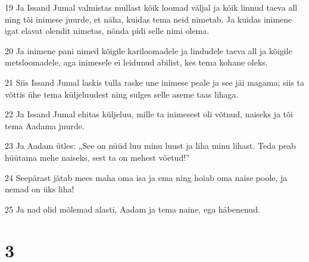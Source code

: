 \par 19 Ja Issand Jumal valmistas mullast kõik loomad väljal ja kõik linnud taeva all ning tõi inimese juurde, et näha, kuidas tema neid nimetab. Ja kuidas inimene igat elavat olendit nimetas, nõnda pidi selle nimi olema.
\par 20 Ja inimene pani nimed kõigile kariloomadele ja lindudele taeva all ja kõigile metsloomadele, aga inimesele ei leidunud abilist, kes tema kohane oleks.
\par 21 Siis Issand Jumal laskis tulla raske une inimese peale ja see jäi magama; siis ta võttis ühe tema küljeluudest ning sulges selle aseme taas lihaga.
\par 22 Ja Issand Jumal ehitas küljeluu, mille ta inimesest oli võtnud, naiseks ja tõi tema Aadama juurde.
\par 23 Ja Aadam ütles: „See on nüüd luu minu luust ja liha minu lihast. Teda peab hüütama mehe naiseks, sest ta on mehest võetud!”
\par 24 Seepärast jätab mees maha oma isa ja ema ning hoiab oma naise poole, ja nemad on üks liha!
\par 25 Ja nad olid mõlemad alasti, Aadam ja tema naine, ega häbenenud.

\chapter{3}


